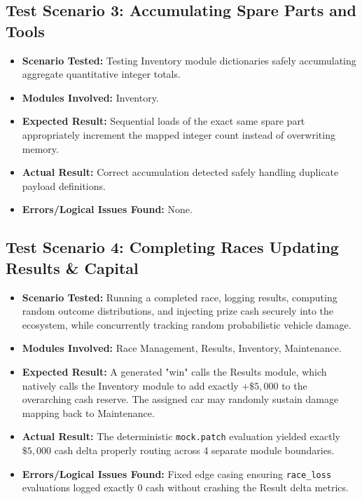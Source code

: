 \documentclass[12pt,a4paper]{article}
\begin{document}
\subsection{Test Scenario 3: Accumulating Spare Parts and Tools}
\begin{itemize}
    \item \textbf{Scenario Tested:} Testing Inventory module dictionaries safely accumulating aggregate quantitative integer totals.
    \item \textbf{Modules Involved:} Inventory.
    \item \textbf{Expected Result:} Sequential loads of the exact same spare part appropriately increment the mapped integer count instead of overwriting memory.
    \item \textbf{Actual Result:} Correct accumulation detected safely handling duplicate payload definitions.
    \item \textbf{Errors/Logical Issues Found:} None. 
\end{itemize}

\subsection{Test Scenario 4: Completing Races Updating Results \& Capital}
\begin{itemize}
    \item \textbf{Scenario Tested:} Running a completed race, logging results, computing random outcome distributions, and injecting prize cash securely into the ecosystem, while concurrently tracking random probabilistic vehicle damage.
    \item \textbf{Modules Involved:} Race Management, Results, Inventory, Maintenance.
    \item \textbf{Expected Result:} A generated "win" calls the Results module, which natively calls the Inventory module to add exactly $+ \$5,000$ to the overarching cash reserve. The assigned car may randomly sustain damage mapping back to Maintenance.
    \item \textbf{Actual Result:} The deterministic \texttt{mock.patch} evaluation yielded exactly $\$5,000$ cash delta properly routing across 4 separate module boundaries.
    \item \textbf{Errors/Logical Issues Found:} Fixed edge casing ensuring \texttt{race\_loss} evaluations logged exactly $0$ cash without crashing the Result delta metrics.
\end{itemize}
\end{document}
